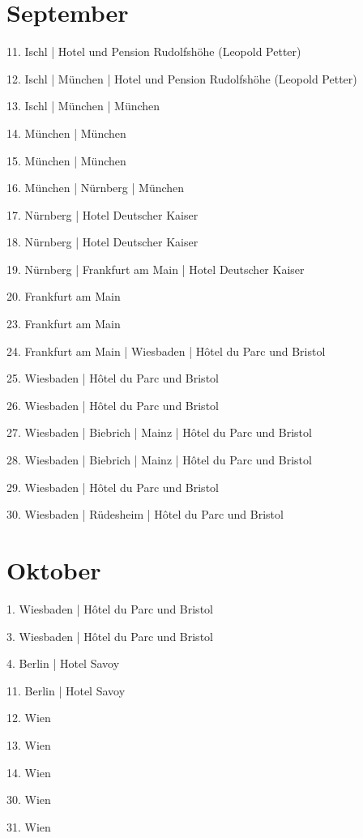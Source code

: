 \documentclass[twoside=false,titlepage=false,open=any, parskip=never, fontsize=10pt, headings=small, chapterprefix=false, appendixprefix=false, DIV=15]{scrbook}
\begin{document}
\begin{multicols}{3}
            \section*{September}
            11. Ischl | Hotel und Pension Rudolfshöhe (Leopold Petter)\par
            12. Ischl | München | Hotel und Pension Rudolfshöhe (Leopold Petter)\par
            13. Ischl | München | München\par
            14. München | München\par
            15. München | München\par
            16. München | Nürnberg | München\par
            17. Nürnberg | Hotel Deutscher Kaiser\par
            18. Nürnberg | Hotel Deutscher Kaiser\par
            19. Nürnberg | Frankfurt am Main | Hotel Deutscher Kaiser\par
            20. Frankfurt am Main\par
            23. Frankfurt am Main\par
            24. Frankfurt am Main | Wiesbaden | Hôtel du Parc und Bristol\par
            25. Wiesbaden | Hôtel du Parc und Bristol\par
            26. Wiesbaden | Hôtel du Parc und Bristol\par
            27. Wiesbaden | Biebrich | Mainz | Hôtel du Parc und Bristol\par
            28. Wiesbaden | Biebrich | Mainz | Hôtel du Parc und Bristol\par
            29. Wiesbaden | Hôtel du Parc und Bristol\par
            30. Wiesbaden | Rüdesheim | Hôtel du Parc und Bristol\par
            \section*{Oktober}
            1. Wiesbaden | Hôtel du Parc und Bristol\par
            3. Wiesbaden | Hôtel du Parc und Bristol\par
            4. Berlin | Hotel Savoy\par
            11. Berlin | Hotel Savoy\par
            12. Wien\par
            13. Wien\par
            14. Wien\par
            30. Wien\par
            31. Wien\par

\end{multicols}
\end{document}
